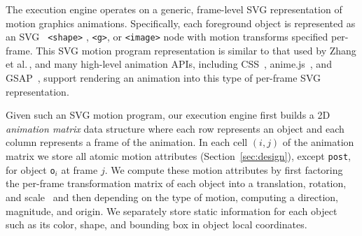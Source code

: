 
The \dslname{} execution engine operates on a generic, frame-level SVG
representation of motion graphics animations.
%
Specifically, each foreground object is represented as an SVG {\tt
  <shape>} , {\tt <g>}, or {\tt <image>} node with motion transforms
specified per-frame.
%
This SVG motion program representation is similar to that used by Zhang et
al.\,, and many high-level animation APIs,
including CSS~\cite{cssAnimation}, anime.js~\cite{animeJs}, and GSAP~\cite{gsap},
support rendering an animation into this type of
per-frame SVG representation.

Given such an SVG motion program, our execution engine first builds a
2D {\em animation matrix} data structure where each row represents an object and each
column represents a frame of the animation.  In each cell $(i,j)$ of
the animation matrix we store all atomic motion attributes (Section~\ref{sec:design}),
except {\tt post}, for object {\tt o$_i$} at frame $j$.
%
%
We compute these motion attributes by first factoring the per-frame
transformation matrix of each object into a translation, rotation, and
scale~\cite{thomas1991} and then depending on the type of motion,
computing a direction, magnitude, and origin.
%
We separately store static information for each object such as its color,
shape, and bounding box in object local coordinates.


